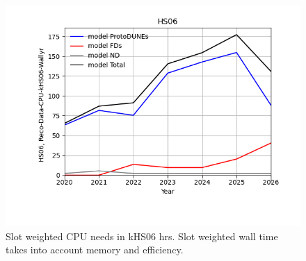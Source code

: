 \begin{figure}[h]
\centering\includegraphics[height=0.4\textwidth]{MoreSim_2022-12-02-2026/MoreSim_2022-12-02-2026-HS06.png}
\caption{Slot weighted CPU needs in kHS06 hrs. Slot weighted wall time takes into account memory and efficiency.}
\label{fig:HS06}
\end{figure}
